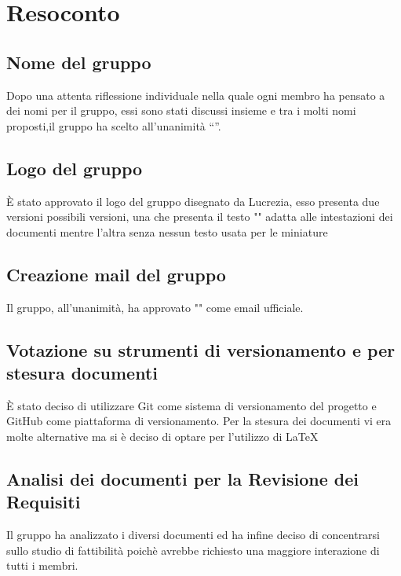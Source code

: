\newpage

\section{Resoconto}

\subsection{Nome del gruppo}

Dopo una attenta riflessione individuale nella quale ogni membro ha pensato a dei nomi per il gruppo, essi sono stati discussi insieme e tra i molti nomi proposti,il gruppo ha scelto all’unanimità “\textit{\Gruppo{}}”.

\subsection{Logo del gruppo}

È stato approvato il logo del gruppo disegnato da Lucrezia, esso presenta due versioni possibili versioni, una che presenta il testo "\Gruppo{}" adatta alle intestazioni dei documenti mentre l'altra senza nessun testo usata per le miniature

\subsection{Creazione mail del gruppo}

Il gruppo, all'unanimità, ha approvato "\textit{\Mail{}}" come email ufficiale.

\subsection{Votazione su strumenti di versionamento e per stesura documenti}

È stato deciso di utilizzare Git come sistema di versionamento del progetto e GitHub come piattaforma di versionamento. Per la stesura dei documenti vi era molte alternative ma si è deciso di optare per l'utilizzo di \LaTeX


\subsection{Analisi dei documenti per la Revisione dei Requisiti}

Il gruppo ha analizzato i diversi documenti ed ha infine deciso di concentrarsi sullo studio di fattibilità poichè avrebbe richiesto una maggiore interazione di tutti i membri.

